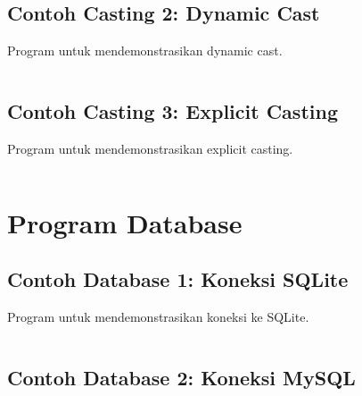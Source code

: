 \begin{lstlisting}[language=c++, caption=Static Cast]

\end{lstlisting}

\subsection{Contoh Casting 2: Dynamic Cast}

Program untuk mendemonstrasikan dynamic cast.

\begin{lstlisting}[language=c++, caption=Dynamic Cast]

\end{lstlisting}

\subsection{Contoh Casting 3: Explicit Casting}

Program untuk mendemonstrasikan explicit casting.

\begin{lstlisting}[language=c++, caption=Explicit Casting]

\end{lstlisting}

\section{Program Database}

\subsection{Contoh Database 1: Koneksi SQLite}

Program untuk mendemonstrasikan koneksi ke SQLite.

\begin{lstlisting}[language=c++, caption=Koneksi SQLite]

\end{lstlisting}

\subsection{Contoh Database 2: Koneksi MySQL}

